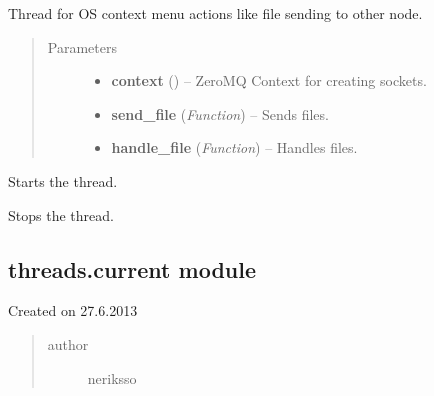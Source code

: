 \documentclass[letterpaper,10pt,english]{sphinxmanual}
\begin{document}
\begin{fulllineitems}
\label{threads:threads.contextmenu.SEND_FILE_CONTEX_MENU_HANDLER}
Thread for OS context menu actions like file sending to other node.
\begin{quote}\begin{description}
\item[{Parameters}] \leavevmode\begin{itemize}
\item {} 
\textbf{context} () -- ZeroMQ Context for creating sockets.

\item {} 
\textbf{send\_file} (\emph{Function}) -- Sends files.

\item {} 
\textbf{handle\_file} (\emph{Function}) -- Handles files.

\end{itemize}

\end{description}\end{quote}

\begin{fulllineitems}
\label{threads:threads.contextmenu.SEND_FILE_CONTEX_MENU_HANDLER.run}
Starts the thread.

\end{fulllineitems}


\begin{fulllineitems}
\label{threads:threads.contextmenu.SEND_FILE_CONTEX_MENU_HANDLER.stop}
Stops the thread.

\end{fulllineitems}


\end{fulllineitems}



\subsection{threads.current module}
\label{threads:threads-current-module}\label{threads:module-threads.current}
Created on 27.6.2013
\begin{quote}\begin{description}
\item[{author}] \leavevmode
neriksso

\end{description}\end{quote}
\end{document}
